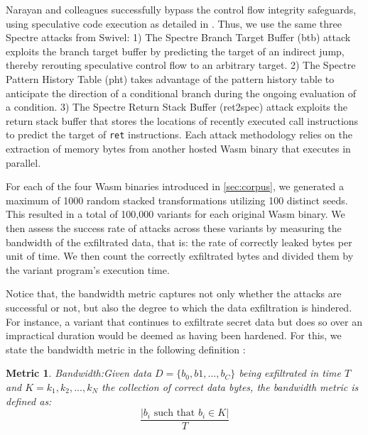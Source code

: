 \documentclass[sigplan,screen]{acmart}
\newcommand*\badge[1]{ \colorbox{red}{\color{white}#1}}
\newcommand{\tool}{{\sc Wasm-Mutate}\xspace}
\newcommand{\wasm}{Wasm\xspace}
\newtheorem{metric}{Metric}
\newcommand{\todo}[1]{%
\refstepcounter{todo}
\noindent\textbf{\badge{TODO}} {\color{red}#1}
\addcontentsline{td}{todo}
{\color{red}\thesection.\thetodo\xspace #1}}
\begin{document}

Narayan and colleagues successfully bypass the control flow integrity safeguards, using speculative code execution as detailed in \cite{Spectre}. 
Thus, we use the same three Spectre attacks from Swivel:
1) The Spectre Branch Target Buffer (btb) attack exploits the branch target buffer by predicting the target of an indirect jump, thereby rerouting speculative control flow to an arbitrary target.
2) The Spectre Pattern History Table (pht) takes advantage of the pattern history table to anticipate the direction of a conditional branch during the ongoing evaluation of a condition. 
3) The Spectre Return Stack Buffer (ret2spec) attack exploits the return stack buffer that stores the locations of recently executed call instructions to predict the target of \texttt{ret} instructions. 
Each attack methodology relies on the extraction of memory bytes from another hosted \wasm binary that executes in parallel.


For each of the four \wasm binaries introduced in \autoref{sec:corpus}, we generated a maximum of 1000 random stacked transformations utilizing 100 distinct seeds. 
This resulted in a total of 100,000 variants for each original \wasm binary.
We then assess the success rate of attacks across these variants by measuring the bandwidth of the exfiltrated data, that is: the rate of correctly leaked bytes per unit of time. 
We then count the correctly exfiltrated bytes and divided them by the variant program's execution time. 

Notice that, the bandwidth metric captures not only whether the attacks are successful or not, but also the degree to which the data exfiltration is hindered.
For instance, a variant that continues to exfiltrate secret data but does so over an impractical duration would be deemed as having been hardened. 
For this, we state the bandwidth metric in the following definition :

\begin{metric}{Bandwidth:}\label{metric:ber}
Given data $D=\{b_0, b1, ..., b_C\}$ being exfiltrated in time $T$ and $K = {k_1, k_2, ..., k_N}$ the collection of correct data bytes, the bandwidth metric is defined as:
$$
    \frac{|b_i\text{ such that } b_i \in K|}{T}
$$
\end{metric}
\end{document}
